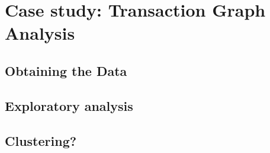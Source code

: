 \chapter{Case study: Transaction Graph Analysis}\label{chap:3}

\section{Obtaining the Data}

\section{Exploratory analysis}





\section{Clustering?}

